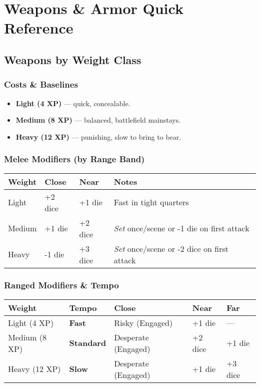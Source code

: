 \appendix
\chapter{Weapons \& Armor Quick Reference}
\label{app:weapons-armor}

\section{Weapons by Weight Class}
\label{app:weapons-weight}

\subsection*{Costs \& Baselines}
\begin{itemize}
  \item \textbf{Light (4 XP)} — quick, concealable.
  \item \textbf{Medium (8 XP)} — balanced, battlefield mainstays.
  \item \textbf{Heavy (12 XP)} — punishing, slow to bring to bear.
\end{itemize}

\subsection*{Melee Modifiers (by Range Band)}
\begin{center}
\begin{tabular}{llll}
\toprule
\textbf{Weight} & \textbf{Close} & \textbf{Near} & \textbf{Notes} \\
\midrule
Light & +2 dice & +1 die & Fast in tight quarters \\
Medium & +1 die & +2 dice & \emph{Set} once/scene or -1 die on first attack \\
Heavy & -1 die  & +3 dice & \emph{Set} once/scene or -2 dice on first attack \\
\bottomrule
\end{tabular}
\end{center}

\subsection*{Ranged Modifiers \& Tempo}
\label{app:ranged-tempo}
\begin{center}
\begin{tabular}{lllll}
\toprule
\textbf{Weight} & \textbf{Tempo} & \textbf{Close} & \textbf{Near} & \textbf{Far} \\
\midrule
Light (4 XP) & \textbf{Fast} & Risky (Engaged) & +1 die & — \\
Medium (8 XP) & \textbf{Standard} & Desperate (Engaged) & +2 dice & +1 die \\
Heavy (12 XP) & \textbf{Slow} & Desperate (Engaged) & +1 die & +3 dice \\
\bottomrule
\end{tabular}
\end{center}


